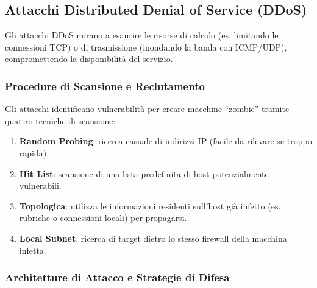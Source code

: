 \subsection{Attacchi Distributed Denial of Service (DDoS)}

Gli attacchi DDoS mirano a esaurire le risorse di calcolo (es.
limitando le connessioni TCP) o di trasmissione (inondando la banda con
ICMP/UDP), compromettendo la disponibilità del servizio.

\subsubsection{Procedure di Scansione e Reclutamento}

Gli attacchi identificano vulnerabilità per creare macchine ``zombie'' tramite quattro tecniche di scansione:

\begin{enumerate}
    \item \textbf{Random Probing}: ricerca casuale di indirizzi IP (facile da rilevare se troppo rapida).
    \item \textbf{Hit List}: scansione di una lista predefinita di host potenzialmente vulnerabili.
    \item \textbf{Topologica}: utilizza le informazioni residenti
    sull'host già infetto (es. rubriche o connessioni locali) per
    propagarsi.
    \item \textbf{Local Subnet}: ricerca di target dietro lo stesso firewall della macchina infetta.
\end{enumerate}

\subsubsection{Architetture di Attacco e Strategie di Difesa}

